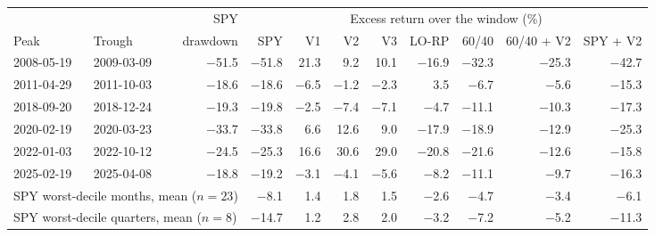 \begin{tabular}{llrrrrrrrrr}
\toprule
& & SPY & \multicolumn{8}{c}{Excess return over the window (\%)} \\
\cmidrule(lr){4-11}
Peak & Trough & drawdown & SPY & V1 & V2 & V3 & LO-RP & 60/40 & 60/40 + V2 & SPY + V2 \\
\midrule
2008-05-19 & 2009-03-09 & $-$51.5 & $-$51.8 & 21.3 & 9.2 & 10.1 & $-$16.9 & $-$32.3 & $-$25.3 & $-$42.7 \\
2011-04-29 & 2011-10-03 & $-$18.6 & $-$18.6 & $-$6.5 & $-$1.2 & $-$2.3 & 3.5 & $-$6.7 & $-$5.6 & $-$15.3 \\
2018-09-20 & 2018-12-24 & $-$19.3 & $-$19.8 & $-$2.5 & $-$7.4 & $-$7.1 & $-$4.7 & $-$11.1 & $-$10.3 & $-$17.3 \\
2020-02-19 & 2020-03-23 & $-$33.7 & $-$33.8 & 6.6 & 12.6 & 9.0 & $-$17.9 & $-$18.9 & $-$12.9 & $-$25.3 \\
2022-01-03 & 2022-10-12 & $-$24.5 & $-$25.3 & 16.6 & 30.6 & 29.0 & $-$20.8 & $-$21.6 & $-$12.6 & $-$15.8 \\
2025-02-19 & 2025-04-08 & $-$18.8 & $-$19.2 & $-$3.1 & $-$4.1 & $-$5.6 & $-$8.2 & $-$11.1 & $-$9.7 & $-$16.3 \\
\midrule
\multicolumn{3}{l}{SPY worst-decile months, mean ($n=23$)} & $-$8.1 & 1.4 & 1.8 & 1.5 & $-$2.6 & $-$4.7 & $-$3.4 & $-$6.1 \\
\multicolumn{3}{l}{SPY worst-decile quarters, mean ($n=8$)} & $-$14.7 & 1.2 & 2.8 & 2.0 & $-$3.2 & $-$7.2 & $-$5.2 & $-$11.3 \\
\bottomrule
\end{tabular}
